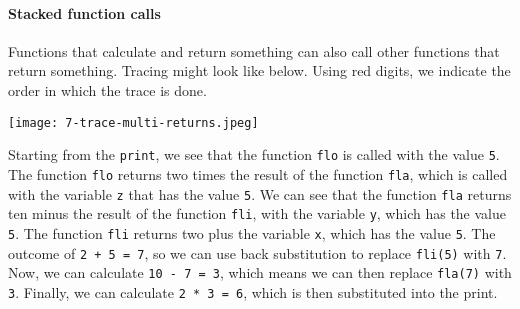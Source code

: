 \paragraph{Stacked function calls} Functions that calculate and return something can also call other functions that return something. Tracing might look like below. Using red digits, we indicate the order in which the trace is done.

\texttt{[image: 7-trace-multi-returns.jpeg]}

Starting from the \texttt{print}, we see that the function \texttt{flo} is called with the value \texttt{5}. The function \texttt{flo} returns two times the result of the function \texttt{fla}, which is called with the variable \texttt{z} that has the value \texttt{5}. We can see that the function \texttt{fla} returns ten minus the result of the function \texttt{fli}, with the variable \texttt{y}, which has the value \texttt{5}. The function \texttt{fli} returns two plus the variable \texttt{x}, which has the value \texttt{5}. The outcome of \texttt{2 + 5 = 7}, so we can use back substitution to replace \texttt{fli(5)} with \texttt{7}. Now, we can calculate \texttt{10 - 7 = 3}, which means we can then replace \texttt{fla(7)} with \texttt{3}. Finally, we can calculate \texttt{2 * 3 = 6}, which is then substituted into the print.
